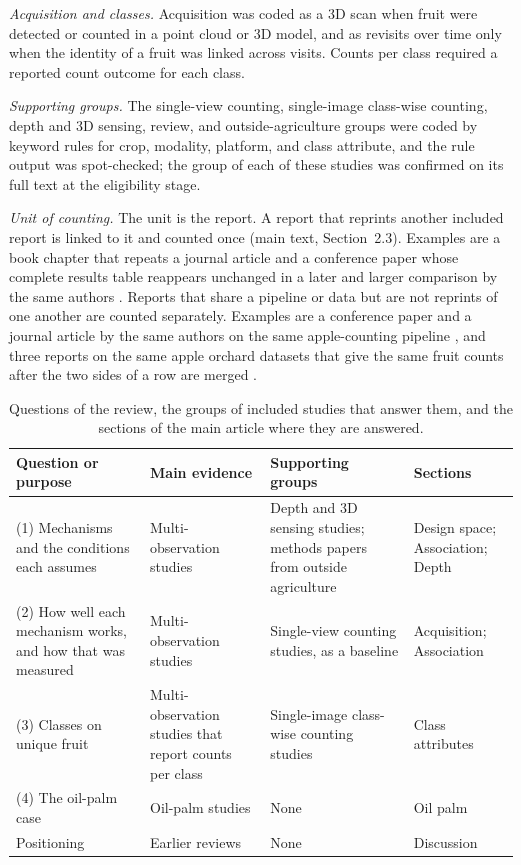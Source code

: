 \documentclass[a4paper,11pt]{article}
\begin{document}
\textit{Acquisition and classes.} Acquisition was coded as a 3D scan when fruit were detected or counted in a point cloud or 3D model, and as revisits over time only when the identity of a fruit was linked across visits. Counts per class required a reported count outcome for each class.

\textit{Supporting groups.} The single-view counting, single-image class-wise counting, depth and 3D sensing, review, and outside-agriculture groups were coded by keyword rules for crop, modality, platform, and class attribute, and the rule output was spot-checked; the group of each of these studies was confirmed on its full text at the eligibility stage.

\textit{Unit of counting.} The unit is the report. A report that reprints another included report is linked to it and counted once (main text, Section~2.3). Examples are a book chapter that repeats a journal article and a conference paper whose complete results table reappears unchanged in a later and larger comparison by the same authors \citep{chowdhury2025comparative}. Reports that share a pipeline or data but are not reprints of one another are counted separately. Examples are a conference paper and a journal article by the same authors on the same apple-counting pipeline \citep{osman2021yieldb,osman2021yield}, and three reports on the same apple orchard datasets that give the same fruit counts after the two sides of a row are merged \citep{roy2019vision,dong2020semantic,hani2020comparative}.

\begin{table}[ht]
\centering
\caption{Questions of the review, the groups of included studies that answer them, and the sections of the main article where they are answered.}\label{tab:rqmap}
\footnotesize
\begin{tabularx}{\textwidth}{@{}L{4.6cm}L{3.6cm}YL{2.6cm}@{}}
\toprule
Question or purpose & Main evidence & Supporting groups & Sections\\
\midrule
(1) Mechanisms and the conditions each assumes & Multi-observation studies & Depth and 3D sensing studies; methods papers from outside agriculture & Design space; Association; Depth\\
(2) How well each mechanism works, and how that was measured & Multi-observation studies & Single-view counting studies, as a baseline & Acquisition; Association\\
(3) Classes on unique fruit & Multi-observation studies that report counts per class & Single-image class-wise counting studies & Class attributes\\
(4) The oil-palm case & Oil-palm studies & None & Oil palm\\
Positioning & Earlier reviews & None & Discussion\\
\bottomrule
\end{tabularx}
\end{table}
\end{document}
